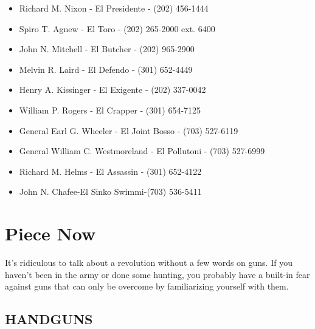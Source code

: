 \documentclass[11pt,twoside,a4paper]{book}
\begin{document}
\begin{itemize}
\item Richard M. Nixon - El Presidente - (202) 456-1444
\item Spiro T. Agnew - El Toro - (202) 265-2000 ext. 6400 
\item John N. Mitchell - El Butcher - (202) 965-2900 
\item Melvin R. Laird - El Defendo - (301) 652-4449 
\item Henry A. Kissinger - El Exigente - (202) 337-0042 
\item William P. Rogers - El Crapper - (301) 654-7125 
\item General Earl G. Wheeler - El Joint Bosso - (703) 527-6119 
\item General William C. Westmoreland - El Pollutoni - (703) 527-6999 
\item Richard M. Helms - El Assassin - (301) 652-4122 
\item John N. Chafee-El Sinko Swimmi-(703) 536-5411
\end{itemize}

\section{Piece Now}

It's ridiculous to talk about a revolution without a few words on guns. If you haven't been in the army or done some hunting, you probably have a built-in fear against guns that can only be overcome by familiarizing yourself with them.

\subsection{HANDGUNS}
\end{document}
